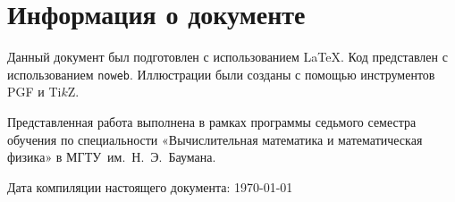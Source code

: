 \documentclass[10pt]{article}
\numberwithin{equation}{section}
\newcommand{\program}[1]{{\tt #1}}
\begin{document}
\clearpage
\appendix
\section{Информация о документе}

Данный документ был подготовлен с использованием \LaTeX{}. Код
представлен с использованием \program{noweb}. Иллюстрации были созданы
с помощью инструментов PGF и Ti$k$Z.

Представленная работа выполнена в рамках программы седьмого семестра
обучения по специальности «Вычислительная математика и математическая
физика» в МГТУ им. Н. Э. Баумана.

Дата компиляции настоящего документа: \today



\end{document}
